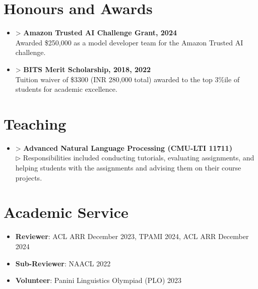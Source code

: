 \documentclass[11pt,letterpaper]{article}
\begin{document}
    \section*{Honours and Awards}
    \begin{itemize}[leftmargin=*,label={},itemsep=4pt]
        \item > \textbf{\textit{} Amazon Trusted AI Challenge Grant, 2024}\\
            Awarded \$250,000 as a model developer team for the Amazon Trusted AI challenge.
            
        \item > \textbf{\textit{} BITS Merit Scholarship, 2018,
                        2022}\\
            Tuition waiver of \$3300 (INR 280,000 total) awarded to the top 3\%ile of students for
                academic excellence.
    \end{itemize}
    
    \section*{Teaching}
    \begin{itemize}[leftmargin=*,label={},itemsep=4pt]
        \item > \textbf{Advanced Natural Language Processing (CMU-LTI 11711)}\\
            $\triangleright$ 
                Responsibilities included conducting tutorials, evaluating assignments, and helping students with the
                assignments and advising them on their course projects.
            \\
    \end{itemize}
    
    \section*{Academic Service}
    \begin{itemize}[leftmargin=*,label={},itemsep=4pt]
        \item \textbf{Reviewer}: ACL ARR December 2023, TPAMI 2024, ACL ARR December 2024\
        \item \textbf{Sub-Reviewer}: NAACL 2022\
        \item \textbf{Volunteer}: Panini Linguistics Olympiad (PLO) 2023\
    \end{itemize}
    
\end{document}
